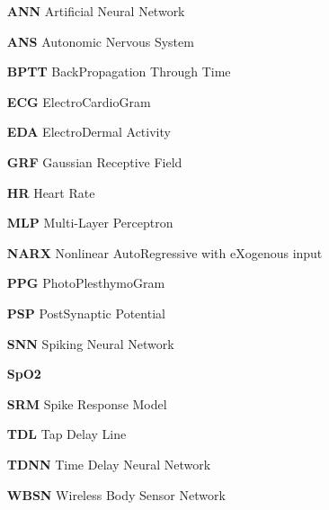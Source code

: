  
\begin{itemize} 

\item[\textbf{ANN}] Artificial Neural Network
\item[\textbf{ANS}] Autonomic Nervous System
\item[\textbf{BPTT}] BackPropagation Through Time
\item[\textbf{ECG}] ElectroCardioGram
\item[\textbf{EDA}] ElectroDermal Activity
\item[\textbf{GRF}] Gaussian Receptive Field
\item[\textbf{HR}] Heart Rate
\item[\textbf{MLP}] Multi-Layer Perceptron
\item[\textbf{NARX}] Nonlinear AutoRegressive with eXogenous input
\item[\textbf{PPG}] PhotoPlesthymoGram
\item[\textbf{PSP}] PostSynaptic Potential
\item[\textbf{SNN}] Spiking Neural Network
\item[\textbf{SpO2}] 
\item[\textbf{SRM}] Spike Response Model
\item[\textbf{TDL}] Tap Delay Line
\item[\textbf{TDNN}] Time Delay Neural Network
\item[\textbf{WBSN}] Wireless Body Sensor Network

\end{itemize} 

